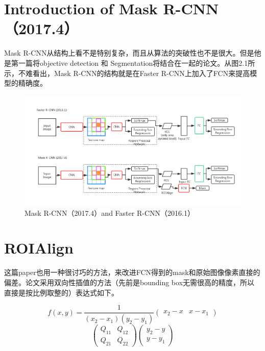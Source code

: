 \documentclass[a4paper,12pt]{report}
\begin{document}
\begin{spacing}{1.5}
\section{Introduction of Mask R-CNN（2017.4）}
Mask R-CNN从结构上看不是特别复杂，而且从算法的突破性也不是很大。但是他是第一篇将objective detection 和 Segmentation将结合在一起的论文。从图2.1所示，不难看出，Mask R-CNN的结构就是在Faster R-CNN上加入了FCN来提高模型的精确度。

\begin{figure}[!h]
	\begin{center}
		\includegraphics[width=0.92\linewidth]{figure//MaskRCNN.png}
		\caption{Mask R-CNN（2017.4）and Faster R-CNN（2016.1）}
		\label{Fig:8}
	\end{center}
\end{figure}

\section{ROIAlign}
这篇paper也用一种很讨巧的方法，来改进FCN得到的mask和原始图像像素直接的偏差。论文采用双向性插值的方法（先前是bounding box无需很高的精度，所以直接是按比例取整的）表达式如下。

\begin{displaymath}
  f(x ,y) = \frac{1}{(x_{2}-x_{1})(y_{2}-y_{1})}
  \left( \begin{array}{cc} x_{2}-x & x-x_{1} \end{array} \right) 
\end{displaymath}
\begin{displaymath}
  \left( \begin{array}{cc} Q_{11} & Q_{12} \\ Q_{21} & Q_{22} \end{array} \right)
  \left( \begin{array}{c} y_{2}-y \\ y-y_{1}\end{array} \right)
\end{displaymath}


\end{spacing}
\end{document}
